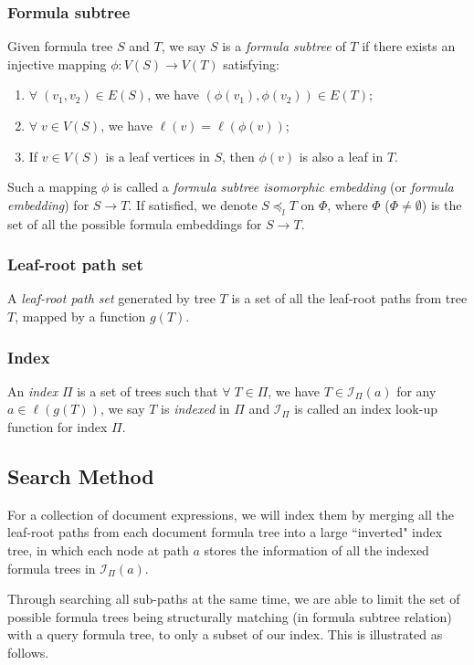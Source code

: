 \documentclass{acm_proc_article-sp}
\begin{document}
\subsubsection{Formula subtree}
\label{frmlsubtreeDef}
Given formula tree $S$ and $T$, we say $S$ is a \textit{formula subtree} of $T$ if there exists an injective mapping $\phi: V(S) \rightarrow V(T)$ satisfying:

\begin{enumerate}
\item 
$\forall\; (v_1,v_2) \in E(S)$, we have $(\phi(v_1),\phi(v_2)) \in E(T)$;
\item
$\forall\; v \in V(S)$, we have $\ell(v) = \ell(\phi(v))$;
\item
If $v \in V(S)$ is a leaf vertices in $S$, then $\phi(v)$ is also a leaf in $T$.
\end{enumerate}
Such a mapping $\phi$ is called a \textit{formula subtree isomorphic embedding} (or \textit{formula embedding}) for $S \rightarrow T$. 
If satisfied, we denote $S \preceq_l T$ on $\Phi$, where $\Phi$ ($\Phi \neq \emptyset$) is the set of all the possible formula embeddings for $S \rightarrow T$.

\subsubsection{Leaf-root path set}
A \textit{leaf-root path set} generated by tree $T$ is a set of all the leaf-root paths from tree $T$, mapped by a function $g(T)$. 

\subsubsection{Index}
An \textit{index} $\Pi$ is a set of trees such that $\forall\; T \in \Pi$, we have $T \in \mathcal{I}_{\Pi}(a)$ for any $a \in \ell(g(T))$, we say $T$ is \textit{indexed} in $\Pi$ and $\mathcal{I}_{\Pi}$ is called an index look-up function for index $\Pi$. 

\subsection{Search Method}
\label{se-method}
For a collection of document expressions, we will index them by merging all the leaf-root paths from each document formula tree into a large ``inverted" index tree, 
in which each node at path $a$ stores the information of all the indexed formula trees in $\mathcal{I}_{\Pi}(a)$.

Through searching all sub-paths at the same time, we are able to limit the set of possible formula trees being structurally matching (in formula subtree relation) with a query formula tree, to only a subset of our index. 
This is illustrated as follows.
\end{document}
